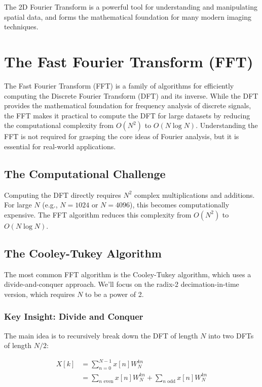 \documentclass[11pt,a4paper]{article}
\begin{document}
The 2D Fourier Transform is a powerful tool for understanding and manipulating spatial data, and forms the mathematical foundation for many modern imaging techniques.

\section{The Fast Fourier Transform (FFT)}

The Fast Fourier Transform (FFT) is a family of algorithms for efficiently computing the Discrete Fourier Transform (DFT) and its inverse. While the DFT provides the mathematical foundation for frequency analysis of discrete signals, the FFT makes it practical to compute the DFT for large datasets by reducing the computational complexity from $O(N^2)$ to $O(N \log N)$. Understanding the FFT is not required for grasping the core ideas of Fourier analysis, but it is essential for real-world applications.

\subsection{The Computational Challenge}

Computing the DFT directly requires $N^2$ complex multiplications and additions. For large $N$ (e.g., $N = 1024$ or $N = 4096$), this becomes computationally expensive. The FFT algorithm reduces this complexity from $O(N^2)$ to $O(N \log N)$.

\subsection{The Cooley-Tukey Algorithm}

The most common FFT algorithm is the Cooley-Tukey algorithm, which uses a divide-and-conquer approach. We'll focus on the radix-2 decimation-in-time version, which requires $N$ to be a power of 2.

\subsubsection{Key Insight: Divide and Conquer}

The main idea is to recursively break down the DFT of length $N$ into two DFTs of length $N/2$:

\begin{align}
X[k] &= \sum_{n=0}^{N-1} x[n] W_N^{kn} \\
&= \sum_{n \text{ even}} x[n] W_N^{kn} + \sum_{n \text{ odd}} x[n] W_N^{kn}
\end{align}
\end{document}
